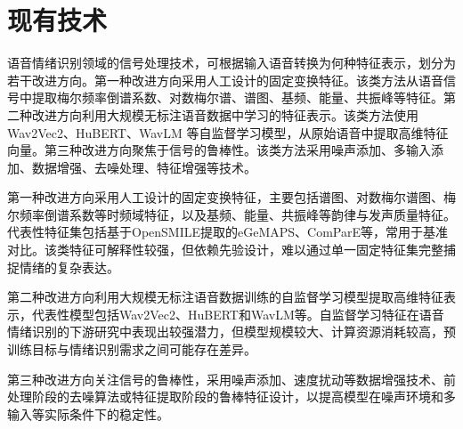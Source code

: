 

\section{现有技术}

语音情绪识别领域的信号处理技术，可根据输入语音转换为何种特征表示，划分为若干改进方向\cite{ma2023review,lin2023chunk,peng2021efficient}。第一种改进方向采用人工设计的固定变换特征。该类方法从语音信号中提取梅尔频率倒谱系数、对数梅尔谱、谱图、基频、能量、共振峰等特征。第二种改进方向利用大规模无标注语音数据中学习的特征表示。该类方法使用 Wav2Vec2、HuBERT、WavLM 等自监督学习模型，从原始语音中提取高维特征向量\cite{thanh2024robust,sampath2025efficient}。第三种改进方向聚焦于信号的鲁棒性。该类方法采用噪声添加、多输入添加、数据增强、去噪处理、特征增强等技术\cite{leem2024selective}。

第一种改进方向采用人工设计的固定变换特征，主要包括谱图、对数梅尔谱图、梅尔频率倒谱系数等时频域特征，以及基频、能量、共振峰等韵律与发声质量特征\cite{ma2023review,peng2021efficient}。代表性特征集包括基于OpenSMILE提取的eGeMAPS、ComParE等，常用于基准对比。该类特征可解释性较强，但依赖先验设计，难以通过单一固定特征集完整捕捉情绪的复杂表达\cite{pappagari2023music}。

第二种改进方向利用大规模无标注语音数据训练的自监督学习模型提取高维特征表示，代表性模型包括Wav2Vec2、HuBERT和WavLM等\cite{baevski2020wav2vec2,hsu2021hubert,chen2022wavlm}。自监督学习特征在语音情绪识别的下游研究中表现出较强潜力\cite{pepino2021wav2vec,fang2023downstreamssl,thanh2024robust}，但模型规模较大、计算资源消耗较高，预训练目标与情绪识别需求之间可能存在差异\cite{sampath2025efficient,feng2023peftser}。

第三种改进方向关注信号的鲁棒性，采用噪声添加、速度扰动等数据增强技术、前处理阶段的去噪算法或特征提取阶段的鲁棒特征设计，以提高模型在噪声环境和多输入等实际条件下的稳定性\cite{leem2024selective,thanh2024robust,tzeng2025noiserobust}。



